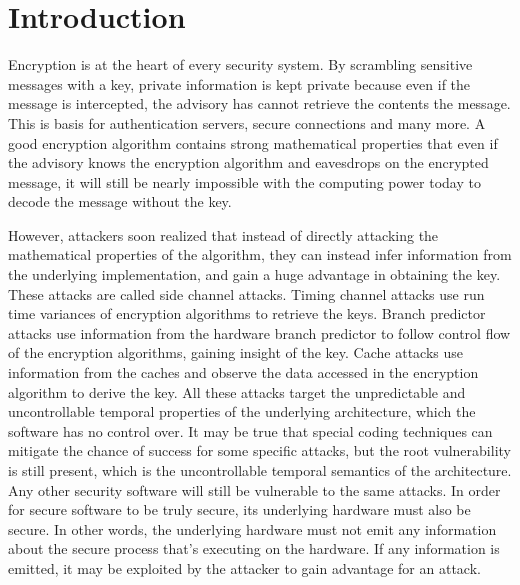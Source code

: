 \documentclass[times, 10pt,twocolumn]{article}
\begin{document}
\section{Introduction}
Encryption is at the heart of every security system. By scrambling sensitive messages with a key, private information is kept private because even if the message is intercepted, the advisory has cannot retrieve the contents the message. This is basis for authentication servers, secure connections and many more. A good encryption algorithm contains strong mathematical properties that even if the advisory knows the encryption algorithm and eavesdrops on the encrypted message, it will still be nearly impossible with the computing power today to decode the message without the key.

However, attackers soon realized that instead of directly attacking the mathematical properties of the algorithm, they can instead infer information from the underlying implementation, and gain a huge advantage in obtaining the key. These attacks are called side channel attacks. Timing channel attacks use run time variances of encryption algorithms to retrieve the keys. Branch predictor attacks use information from the hardware branch predictor to follow control flow of the encryption algorithms, gaining insight of the key. Cache attacks use information from the caches and observe the data accessed in the encryption algorithm to derive the key. All these attacks target the unpredictable and uncontrollable temporal properties of the underlying architecture, which the software has no control over.  It may be true that special coding techniques can mitigate the chance of success for some specific attacks, but the root vulnerability is still present, which is the uncontrollable temporal semantics of the architecture. Any other security software will still be vulnerable to the same attacks. In order for secure software to be truly secure, its underlying hardware must also be secure. In other words, the underlying hardware must not emit any information about the secure process that's executing on the hardware. If any information is emitted, it may be exploited by the attacker to gain advantage for an attack. 
\end{document}
